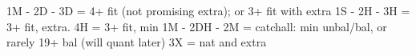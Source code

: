 1M - 2D - 3D = 4+ fit (not promising extra); or 3+ fit with extra
1S - 2H - 3H = 3+ fit, extra. 4H = 3+ fit, min
1M - 2DH - 2M = catchall: min unbal/bal, or rarely 19+ bal (will quant later)
3X = nat and extra